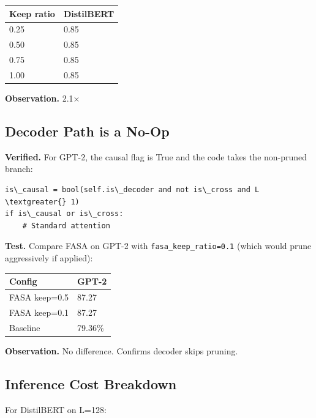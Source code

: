 \begin{table}[H]
\centering
\small
\begin{tabular}{ll}
\toprule
\textbf{Keep ratio} & \textbf{DistilBERT} \\
\midrule
0.25 & 0.85 \\
0.50 & 0.85 \\
0.75 & 0.85 \\
1.00 & 0.85 \\
\bottomrule
\end{tabular}
\end{table}

\textbf{Observation.} 2.1$\times$

\subsection{Decoder Path is a No-Op}

\textbf{Verified.} For GPT-2, the causal flag is True and the code takes the 
non-pruned branch:

\begin{lstlisting}
is\_causal = bool(self.is\_decoder and not is\_cross and L \textgreater{} 1)
if is\_causal or is\_cross:
    # Standard attention
\end{lstlisting}

\textbf{Test.} Compare FASA on GPT-2 with \texttt{fasa\_keep\_ratio=0.1} (which would 
prune aggressively if applied):

\begin{table}[H]
\centering
\small
\begin{tabular}{ll}
\toprule
\textbf{Config} & \textbf{GPT-2} \\
\midrule
FASA keep=0.5 & 87.27 \\
FASA keep=0.1 & 87.27 \\
Baseline & 79.36\% \\
\bottomrule
\end{tabular}
\end{table}

\textbf{Observation.} No difference. Confirms decoder skips pruning.

\subsection{Inference Cost Breakdown}

For DistilBERT on L=128:

